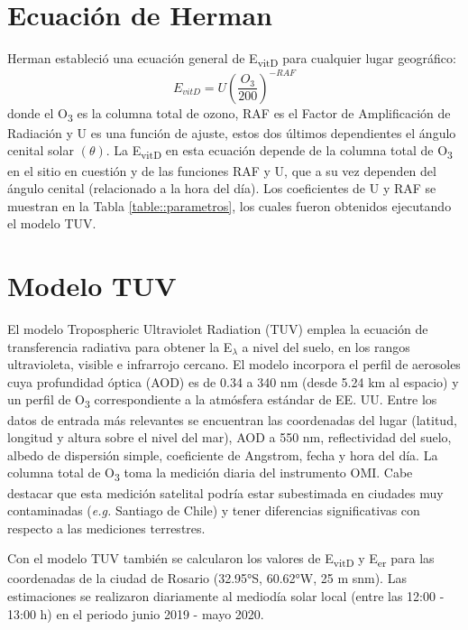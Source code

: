 \documentclass[10pt,twocolumn]{article}
\begin{document}
\section{Ecuación de Herman}
Herman\cite{Herman2010} estableció una ecuación general de E\textsubscript{vitD} para cualquier lugar geográfico:
\begin{equation}
  E_{vitD}=U\left(\frac{O_3}{200}\right)^{-RAF}
  \label{eq:evitd}
\end{equation}
donde el O\textsubscript{3} es la columna total de ozono, RAF es el Factor de Amplificación de Radiación y U es una función de ajuste, estos dos últimos dependientes el ángulo cenital solar $(\theta)$. La E\textsubscript{vitD} en esta ecuación depende de la columna total de O\textsubscript{3} en el sitio en cuestión y de las funciones RAF y U, que a su vez dependen del ángulo cenital (relacionado a la hora del día). Los coeficientes de U y RAF se muestran en la Tabla \ref{table::parametros}, los cuales fueron obtenidos ejecutando el modelo TUV.

\section{Modelo TUV}
El modelo Tropospheric Ultraviolet Radiation (TUV)\cite{Madronich1987} emplea la ecuación de transferencia radiativa para obtener la E$_\lambda$ a nivel del suelo, en los rangos ultravioleta, visible e infrarrojo cercano. El modelo incorpora el perfil de aerosoles cuya profundidad óptica (AOD) es de 0.34 a 340 nm (desde 5.24 km al espacio) y un perfil de O\textsubscript{3} correspondiente a la atmósfera estándar de EE. UU. Entre los datos de entrada más relevantes se encuentran las coordenadas del lugar (latitud, longitud y altura sobre el nivel del mar), AOD a 550 nm, reflectividad del suelo, albedo de dispersión simple, coeficiente de Angstrom, fecha y hora del día. La columna total de O\textsubscript{3} toma la medición diaria del instrumento OMI. Cabe destacar que esta medición satelital podría estar subestimada en ciudades muy contaminadas (\emph{e.g.} Santiago de Chile) y tener diferencias significativas con respecto a las mediciones terrestres.

Con el modelo TUV también se calcularon los valores de E\textsubscript{vitD} y E\textsubscript{er} para las coordenadas de la ciudad de Rosario (32.95°S, 60.62°W, 25 m snm). Las estimaciones se realizaron diariamente al mediodía solar local (entre las 12:00 - 13:00 h) en el periodo junio 2019 - mayo 2020.
\end{document}
